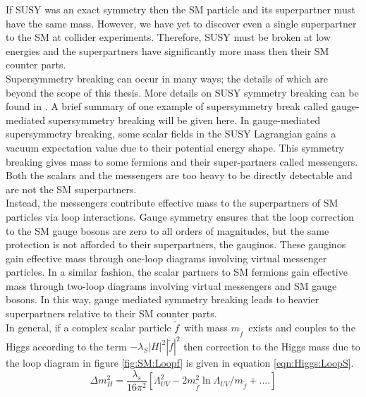 \indent If SUSY was an exact symmetry then the SM particle and its superpartner must have the same mass.  However, we have yet to discover even a single superpartner to the SM at collider experiments.  Therefore, SUSY must be broken at low energies and the superpartners have significantly more mass then their SM counter parts.  \\

\indent Supersymmetry breaking can occur in many ways; the details of which are beyond the scope of this thesis.  More details on SUSY symmetry breaking can be found in \cite{MartinSUSY}.  A brief summary of one example of supersymmetry break called gauge-mediated supersymmetry breaking will be given here.   In gauge-mediated supersymmetry breaking, some scalar fields in the SUSY Lagrangian gains a vacuum expectation value due to their potential energy shape.  This symmetry breaking gives mass to some fermions and their super-partners called messengers.  Both the scalars and the messengers are too heavy to be directly detectable and are not the SM superpartners.  \\

\indent Instead, the messengers contribute effective mass to the superpartners of SM particles via loop interactions.  Gauge symmetry ensures that the loop correction to the SM gauge bosons are zero to all orders of magnitudes, but the same protection is not afforded to their superpartners, the gauginos.  These gauginos gain effective mass through one-loop diagrams involving virtual messenger particles.  In a similar fashion, the scalar partners to SM fermions gain effective mass through two-loop diagrams involving virtual messengers and SM gauge bosons.  In this way, gauge mediated symmetry breaking leads to heavier superpartners relative to their SM counter parts.  \\


\indent In general, if a complex scalar particle $\tilde{f}$~with mass $m_{\tilde{f}}$~exists and couples to the Higgs according to the term $-\lambda_S|H|^2|\tilde{f}|^2$ then correction to the Higgs mass due to the loop diagram in figure \ref{fig:SM:Loopf} is given in equation \ref{eqn:Higgs:LoopS}. \\

\begin{equation}
\label{eqn:Higgs:LoopS}
\Delta m_H^2 = \frac{\lambda_s}{16\pi^2}[\Lambda^2_{UV} - 2m_{\tilde{f}}^2 \ln{\Lambda_{UV}/m_{\tilde{f}}}+ ....]
\end{equation}

